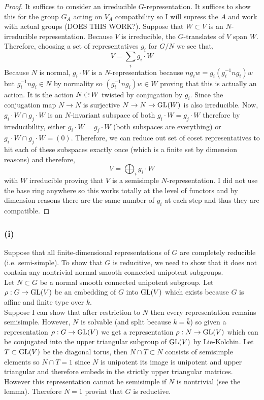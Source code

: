 \documentclass[12pt]{article}
\begin{document}
\begin{proof}
It suffices to consider an irreducible $G$-representation. It suffices to show this for the group $G_A$ acting on $V_A$ compatbility so I will supress the $A$ and work with actual groups (DOES THIS WORK?). Suppose that $W \subset V$ is an $N$-irreducible representation. Because $V$ is irreducible, the $G$-translates of $V$ span $W$. Therefore, choosing a set of representatives $g_i$ for $G/N$ we see that,
\[ V = \sum_{i} g_i \cdot W \]
Because $N$ is normal, $g_i \cdot W$ is a $N$-representation because $n g_i w = g_i (g_i^{-1} n g_i) w$ but $g_i^{-1} n g_i \in N$ by normality so $(g_i^{-1} n g_i) w \in W$ proving that this is actually an action. It is the action $N \acts W$ twisted by conjugation by $g_i$. Since the conjugation map $N \to N$ is surjective $N \to N \to \mathrm{GL}{(W)}$ is also irreducible. Now, $g_i \cdot W \cap g_j \cdot W$ is an $N$-invariant subspace of both $g_i \cdot W = g_j \cdot W$ therefore by irreducibility, either $g_i \cdot W = g_j \cdot W$ (both subspaces are everything) or $g_i \cdot W \cap g_j \cdot W = (0)$. Therefore, we can reduce out set of coset representatives to hit each of these subspaces exactly once (which is a finite set by dimension reasons) and therefore,
\[ V = \bigoplus_{i} g_i \cdot W \]
with $W$ irreducible proving that $V$ is a semisimple $N$-representation. I did not use the base ring anywhere so this works totally at the level of functors and by dimension reasons there are the same number of $g_i$ at each step and thus they are compatible. 
\end{proof}

\subsubsection{(i)}

Suppose that all finite-dimensional representations of $G$ are completely reducible (i.e. semi-simple). To show that $G$ is reducitive, we need to show that it does not contain any nontrivial normal smooth connected unipotent subgroups. 
\bigskip\\
Let $N \subset G$ be a normal smooth connected unipotent subgroup. Let $\rho : G \to \mathrm{GL}{(V)}$ be an embedding of $G$ into $\mathrm{GL}{(V)}$ which exists because $G$ is affine and finite type over $k$.
\bigskip\\
Suppose I can show that after restriction to $N$ then every representation remains semisimple. However, $N$ is solvable (and split because $k = \bar{k}$) so given a representation $\rho : G \to \mathrm{GL}{(V)}$ we get a representation $\rho : N \to \mathrm{GL}{(V)}$ which can be conjugated into the upper triangular subgroup of $\mathrm{GL}{(V)}$ by Lie-Kolchin. Let $T \subset \mathrm{GL}{(V)}$ be the diagonal torus, then $N \cap T \subset N$ consists of semisimple elements so $N \cap T = 1$ since $N$ is unipotent its image is unipotent and upper triangular and therefore embeds in the strictly upper triangular matrices. However this representation cannot be semisimple if $N$ is nontrivial (see the lemma). Therefore $N = 1$ provint that $G$ is reductive.
\end{document}

